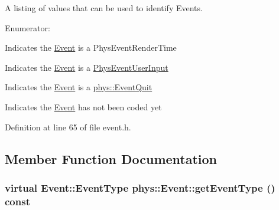 A listing of values that can be used to identify Events. \begin{Desc}
\item[Enumerator: ]\par
\begin{description}
\item[{\em 
\hypertarget{classphys_1_1Event_af5fdbb3e08d8e578d58770fbc606fda7a72c30ea5e5c4f5cb55382ad0d1317aa8}{
RenderTime}
\label{d5/dcb/classphys_1_1Event_af5fdbb3e08d8e578d58770fbc606fda7a72c30ea5e5c4f5cb55382ad0d1317aa8}
}]Indicates the \hyperlink{classphys_1_1Event}{Event} is a PhysEventRenderTime \item[{\em 
\hypertarget{classphys_1_1Event_af5fdbb3e08d8e578d58770fbc606fda7a91c3cf8e29385c1e10925d3bd4778cfc}{
UserInput}
\label{d5/dcb/classphys_1_1Event_af5fdbb3e08d8e578d58770fbc606fda7a91c3cf8e29385c1e10925d3bd4778cfc}
}]Indicates the \hyperlink{classphys_1_1Event}{Event} is a \hyperlink{classPhysEventUserInput}{PhysEventUserInput} \item[{\em 
\hypertarget{classphys_1_1Event_af5fdbb3e08d8e578d58770fbc606fda7a085b70182742e0cc874f04f8aa615ff0}{
QuitMessage}
\label{d5/dcb/classphys_1_1Event_af5fdbb3e08d8e578d58770fbc606fda7a085b70182742e0cc874f04f8aa615ff0}
}]Indicates the \hyperlink{classphys_1_1Event}{Event} is a \hyperlink{classphys_1_1EventQuit}{phys::EventQuit} \item[{\em 
\hypertarget{classphys_1_1Event_af5fdbb3e08d8e578d58770fbc606fda7a7558324b74ee7b6ec1e69d7ab1a13749}{
SystemMessage}
\label{d5/dcb/classphys_1_1Event_af5fdbb3e08d8e578d58770fbc606fda7a7558324b74ee7b6ec1e69d7ab1a13749}
}]Indicates the \hyperlink{classphys_1_1Event}{Event} has not been coded yet \end{description}
\end{Desc}



Definition at line 65 of file event.h.



\subsection{Member Function Documentation}
\hypertarget{classphys_1_1Event_ac2c0623a6bc399e62f4b9fb2c022ea73}{
\subsubsection[{getEventType}]{\setlength{\rightskip}{0pt plus 5cm}virtual {\bf Event::EventType} phys::Event::getEventType () const}}
\label{d5/dcb/classphys_1_1Event_ac2c0623a6bc399e62f4b9fb2c022ea73}



